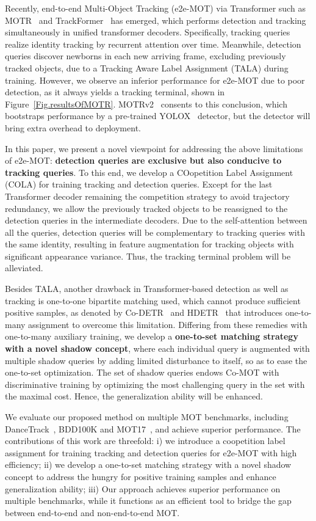 \documentclass{article}
\begin{document}
Recently, end-to-end Multi-Object Tracking (e2e-MOT) via Transformer such as MOTR~\cite{zeng2022motr} and TrackFormer~\cite{meinhardt2022trackformer} has emerged, which performs detection and tracking simultaneously in unified transformer decoders. Specifically, tracking queries realize identity tracking by recurrent attention over time. Meanwhile, detection queries discover newborns in each new arriving frame, excluding previously tracked objects, due to a Tracking Aware Label Assignment (TALA) during training. However, we observe an inferior performance for e2e-MOT due to poor detection, as it always yields a tracking terminal, shown in Figure~\ref{Fig.resultsOfMOTR}. MOTRv2~\cite{zhang2022motrv2} consents to this conclusion, which bootstraps performance by a pre-trained YOLOX~\cite{ge2021yolox} detector, but the detector will bring extra overhead to deployment. 

In this paper, we present a novel viewpoint for addressing the above limitations of e2e-MOT: \textbf{detection queries are exclusive but also conducive to tracking queries}. To this end, we develop a COopetition Label Assignment (COLA) for training tracking and detection queries. Except for the last Transformer decoder remaining the competition strategy to avoid trajectory redundancy, we allow the previously tracked objects to be reassigned to the detection queries in the intermediate decoders. Due to the self-attention between all the queries, detection queries will be complementary to tracking queries with the same identity, resulting in feature augmentation for tracking objects with significant appearance variance. Thus, the tracking terminal problem will be alleviated. 

Besides TALA, another drawback in Transformer-based detection as well as tracking is one-to-one bipartite matching used, which cannot produce sufficient positive samples, as denoted by Co-DETR~\cite{zong2022detrs} and HDETR~\cite{jia2022detrs} that introduces one-to-many assignment to overcome this limitation. Differing from these remedies with one-to-many auxiliary training, we develop a \textbf{one-to-set matching strategy with a novel shadow concept}, where each individual query is augmented with multiple shadow queries by adding limited disturbance to itself, so as to ease the one-to-set optimization. The set of shadow queries endows Co-MOT with discriminative training by optimizing the most challenging query in the set with the maximal cost. Hence, the generalization ability will be enhanced.

We evaluate our proposed method on multiple MOT benchmarks, including DanceTrack~\cite{sun2022dancetrack}, BDD100K\cite{yu2020bdd100k} and MOT17~\cite{milan2016mot16}, and achieve superior performance. The contributions of this work are threefold: i) we introduce a coopetition label assignment for training tracking and detection queries for e2e-MOT with high efficiency; ii) we develop a one-to-set matching strategy with a novel shadow concept to address the hungry for positive training samples and enhance generalization ability; iii) Our approach achieves superior performance on multiple benchmarks, while it functions as an efficient tool to bridge the gap between end-to-end and non-end-to-end MOT.
\end{document}
